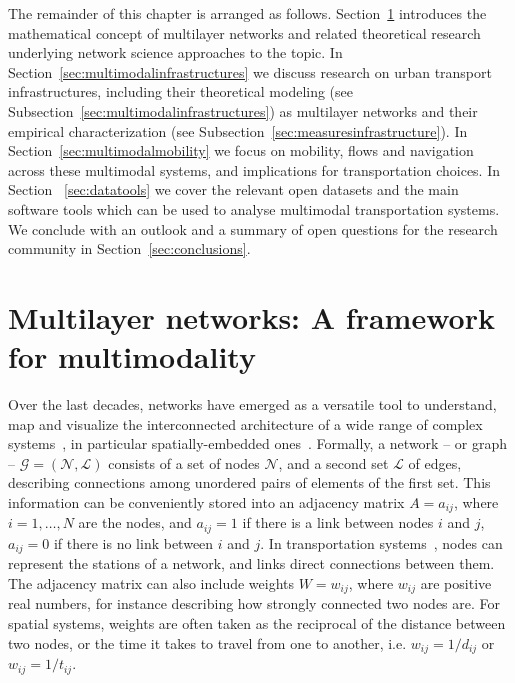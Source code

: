 The remainder of this chapter is arranged as follows. Section~\ref{sec:multilayernetworks} introduces the mathematical concept of multilayer networks and related theoretical research underlying network science approaches to the topic. In Section~\ref{sec:multimodalinfrastructures} we discuss research on urban transport infrastructures, including their theoretical modeling (see Subsection~\ref{sec:multimodalinfrastructures}) as multilayer networks and their empirical characterization (see Subsection~\ref{sec:measuresinfrastructure}). In Section~\ref{sec:multimodalmobility} we focus on mobility, flows and navigation across these multimodal systems, and implications for transportation choices. In Section ~\ref{sec:datatools} we cover the relevant open datasets and the main software tools which can be used to analyse multimodal transportation systems. We conclude with an outlook and a summary of open questions for the research community in Section~\ref{sec:conclusions}. 

\section{Multilayer networks: A framework for multimodality}\label{sec:multilayernetworks}

Over the last decades, networks have emerged as a versatile tool to understand, map and visualize the interconnected architecture of a wide range of complex systems~\cite{albert2002statistical,dorogovtsev2002evolution, newman2003structure, boccaletti2006complex}, in particular spatially-embedded ones~\cite{barthelemy2011spatial, barthelemy2018morphogenesis}. Formally, a network -- or graph -- $\mathcal G = (\mathcal N, \mathcal L)$ consists of a set of nodes $\mathcal N$, and a second set $\mathcal L$ of edges, describing connections among unordered pairs of elements of the first set. This information can be conveniently stored into an adjacency matrix ${A=a_{ij}}$, where $i=1, \dots, N$ are the nodes, and $a_{ij}=1$ if there is a link between nodes $i$ and $j$, $a_{ij}=0$ if there is no link between $i$ and $j$. In transportation systems~\cite{lin2013complex}, nodes can represent the stations of a network, and links direct connections between them. The adjacency matrix can also include weights $W=w_{ij}$, where $w_{ij}$ are positive real numbers, for instance describing how strongly connected two nodes are. For spatial systems, weights are often taken as the reciprocal of the distance between two nodes, or the time it takes to travel from one to another, i.e. $w_{ij}=1/d_{ij}$ or $w_{ij}=1/t_{ij}$.


